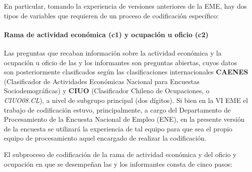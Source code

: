 \documentclass[
]{article}
\begin{document}
En particular, tomando la experiencia de versiones anteriores de la EME, hay dos tipos de variables que requieren de un proceso de codificación específico:

\hypertarget{rama-de-actividad-econuxf3mica-c1-y-ocupaciuxf3n-u-oficio-c2}{%
\paragraph{Rama de actividad económica (c1) y ocupación u oficio (c2)}\label{rama-de-actividad-econuxf3mica-c1-y-ocupaciuxf3n-u-oficio-c2}}

Las preguntas que recaban información sobre la actividad económica y la ocupación u oficio de las y los informantes son preguntas abiertas, cuyos datos son posteriormente clasificados según las clasificaciones internacionales \textbf{CAENES} (Clasificador de Actividades Económicas Nacional para Encuestas Sociodemográficas) y \textbf{CIUO} (Clasificador Chileno de Ocupaciones, o \emph{CIUO08.CL}), a nivel de subgrupo principal (dos dígitos). Si bien en la VI EME el trabajo de codificación estuvo, principalmente, a cargo del Departamento de Procesamiento de la Encuesta Nacional de Empleo (ENE), en la presente versión de la encuesta se utilizará la experiencia de tal equipo para que sea el propio equipo de procesamiento aquel encargado de realizar la codificación.

El subproceso de codificación de la rama de actividad económica y del oficio y ocupación en que se desempeñan las y los informantes consta de cinco pasos:
\end{document}

